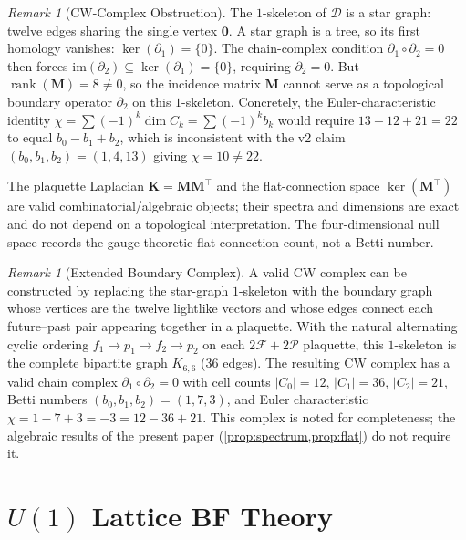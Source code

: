 \documentclass[12pt, a4paper]{article}
\theoremstyle{plain}
\theoremstyle{definition}
\theoremstyle{remark}
\newtheorem{remark}[theorem]{Remark}
\newcommand{\CD}{\mathscr{D}}
\newcommand{\FS}{\mathcal{F}}
\newcommand{\PS}{\mathcal{P}}
\newcommand{\Kmat}{\mathbf{K}}
\newcommand{\Mmat}{\mathbf{M}}
\newcommand{\rank}{\operatorname{rank}}
\begin{document}
\begin{remark}[CW-Complex Obstruction]\label{rem:CW}
The $1$-skeleton of $\CD$ is a star graph: twelve edges sharing
the single vertex $\bm{0}$.
A star graph is a tree, so its first homology vanishes:
$\ker(\partial_1) = \{0\}$.
The chain-complex condition $\partial_1\circ\partial_2 = 0$
then forces $\mathrm{im}(\partial_2) \subseteq \ker(\partial_1)
= \{0\}$, requiring $\partial_2 = 0$.
But $\rank(\Mmat) = 8 \neq 0$, so the incidence matrix $\Mmat$
cannot serve as a topological boundary operator $\partial_2$ on
this $1$-skeleton.
Concretely, the Euler-characteristic identity
$\chi = \sum(-1)^k\dim C_k = \sum(-1)^k b_k$ would require
$13 - 12 + 21 = 22$ to equal $b_0 - b_1 + b_2$, which is
inconsistent with the v2 claim $(b_0,b_1,b_2) = (1,4,13)$
giving $\chi = 10 \neq 22$.
 
The plaquette Laplacian $\Kmat = \Mmat\Mmat^\top$ and the
flat-connection space $\ker(\Mmat^\top)$ are valid
combinatorial/algebraic objects; their spectra and dimensions
are exact and do not depend on a topological interpretation.
The four-dimensional null space records the gauge-theoretic
flat-connection count, not a Betti number.
\end{remark}
 
\begin{remark}[Extended Boundary Complex]\label{rem:extended}
A valid CW complex can be constructed by replacing the star-graph
$1$-skeleton with the boundary graph whose vertices are the twelve
lightlike vectors and whose edges connect each future--past pair
appearing together in a plaquette.
With the natural alternating cyclic ordering
$f_1\to p_1\to f_2\to p_2$ on each $2\FS+2\PS$ plaquette,
this $1$-skeleton is the complete bipartite graph $K_{6,6}$
(36 edges).
The resulting CW complex has a valid chain complex
$\partial_1\circ\partial_2 = 0$ with cell counts
$|C_0|=12$, $|C_1|=36$, $|C_2|=21$, Betti numbers
$(b_0,b_1,b_2)=(1,7,3)$, and Euler characteristic
$\chi = 1 - 7 + 3 = -3 = 12 - 36 + 21$.
This complex is noted for completeness; the algebraic results
of the present paper (\cref{prop:spectrum,prop:flat}) do not
require it.
\end{remark}

\section{\texorpdfstring{$U(1)$}{U(1)} Lattice BF Theory}
\label{sec:BF}
\end{document}

